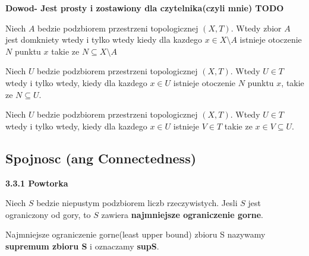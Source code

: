 \documentclass{article}
\begin{document}
\textbf{Dowod- Jest prosty i zostawiony dla czytelnika(czyli mnie) TODO}

\begin{tcolorbox}[colback=white!90!cyan,colframe=black!35!cyan,title=3.2.7 Wniosek: Otoczenie i domknietosc zbioru A]

    Niech $A$ bedzie podzbiorem przestrzeni topologicznej $(X,T)$. Wtedy zbior $A$ jest domkniety wtedy i tylko wtedy kiedy dla kazdego $x \in X\setminus A$ istnieje otoczenie $N$ punktu $x$ takie ze $N \subseteq X\setminus A$

\end{tcolorbox}

\begin{tcolorbox}[colback=white!90!cyan,colframe=black!35!cyan,title=3.2.8 Wniosek: Otoczenie i otwartosc zbioru A]

    Niech $U$ bedzie podzbiorem przestrzeni topologicznej $(X,T)$. Wtedy $U\in T$ wtedy i tylko wtedy, kiedy dla kazdego $x\in U$ istnieje otoczenie $N$ punktu $x$, takie ze $N\subseteq U$.

\end{tcolorbox}

\begin{tcolorbox}[colback=white!90!cyan,colframe=black!35!cyan,title=3.2.9 Wniosek: Otoczenie i otwartosc zbioru A: v2]
    Niech $U$ bedzie podzbiorem przestrzeni topologicznej $(X,T)$. Wtedy $U\in T$ wtedy i tylko wtedy, kiedy dla kazdego $x\in U$ istnieje $V \in T$ takie ze $x\in V \subseteq U.$

\end{tcolorbox}

\subsection{Spojnosc (ang Connectedness)}

\textbf{3.3.1 Powtorka}

\begin{tcolorbox}[colback=white!90!blue,colframe=black!35!blue,title=Aksjomat najmniejszego gornego ograniczenia(least upper bound axiom)]

Niech $S$ bedzie niepustym podzbiorem liczb rzeczywistych. Jesli $S$ jest ograniczony od gory, to $S$ zawiera \textbf{najmniejsze ograniczenie gorne}.
\end{tcolorbox}

Najmniejsze ograniczenie gorne(least upper bound) zbioru S nazywamy \textbf{supremum zbioru S} i oznaczamy \textbf{supS}.
\end{document}
